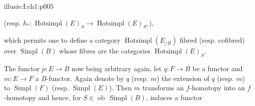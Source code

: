 \begin{illusiebodypage}{illusie:I:ch1:p005}
\hypertarget{illusie:I:ch1:s1:1:eq7}{}%
\noindent{}\par
\noindent\hfill (resp. $h_*:\operatorname{Hotsimpl}(E)_S\longrightarrow
\operatorname{Hotsimpl}(E)_{S''}$),\hfill\mbox{}\par

\hypertarget{illusie:I:ch1:s1:1:p18}{}%
which permits one to define a category $\operatorname{Hotsimpl}(E_{/B})$
fibred (resp. cofibred) over $\operatorname{Simpl}(B)$ whose fibres are the
categories $\operatorname{Hotsimpl}(E)_S$.

\hypertarget{illusie:I:ch1:s1:1:p19}{}%
The functor $p:E\longrightarrow B$ now being arbitrary again, let
$q:F\longrightarrow B$ be a functor and $m:E\longrightarrow F$ a
$B$-functor. Again denote by $q$ (resp. $m$) the extension of $q$ (resp. $m$)
to $\operatorname{Simpl}(F)$ (resp. $\operatorname{Simpl}(E)$). Then $m$
transforms an $f$-homotopy into an $f$-homotopy and hence, for
$S\in\operatorname{ob}\,\operatorname{Simpl}(B)$, induces a functor
\end{illusiebodypage}
